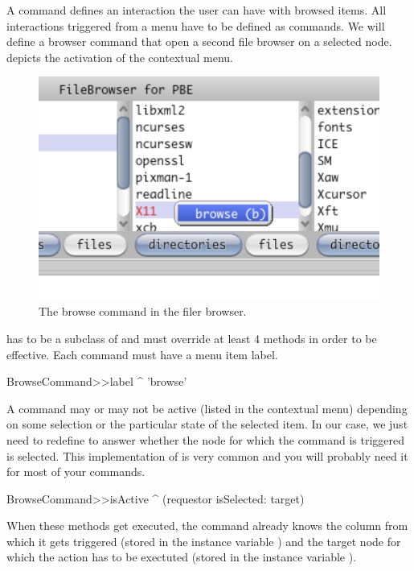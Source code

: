 \documentclass[a4paper,10pt,twoside]{book}
\begin{document}
A command defines an interaction the user can have with browsed items. All interactions triggered from a menu have to be defined as commands. We will define a browser command that open a second file browser on a selected node.  depicts the activation of the contextual menu.


\begin{figure}[!ht]
\begin{center}
\includegraphics[scale=0.34]{command}
\caption{The browse command in the filer browser.} \label{fig:command}
\end{center}
\end{figure}


 has to be a subclass of  and must override at least 4 methods in order to be effective. Each command must have a menu item label.
\begin{code}{}    
BrowseCommand>>label
	^ 'browse'
\end{code}

A command may or may not be active (\ie listed in the contextual menu) depending on some selection or the particular state of the selected item. In our case, we just need to redefine  to answer whether the node for which the command is triggered is selected. This implementation of  is very common and you will probably need it for most of your commands.

\begin{code}{}    
BrowseCommand>>isActive
	^ (requestor isSelected: target)
\end{code}

When these methods get executed, the command already knows the column from which it gets triggered (stored in the instance variable ) and the target node for which the action has to be exectuted (stored in the instance variable ). 
\end{document}
